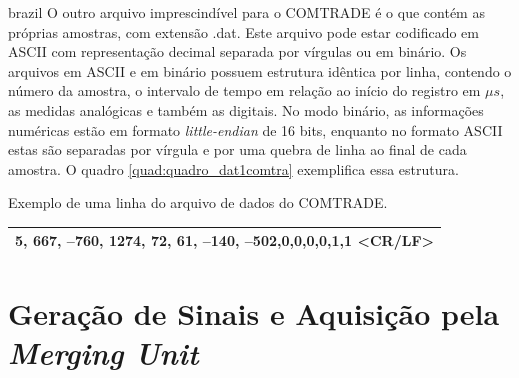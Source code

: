 \begin{otherlanguage*}{brazil}
O outro arquivo imprescindível para o COMTRADE é o que contém as próprias amostras, com extensão .dat. Este arquivo pode estar codificado em ASCII com representação decimal separada por vírgulas ou em binário. Os arquivos em ASCII e em binário possuem estrutura idêntica por linha, contendo o número da amostra, o intervalo de tempo em relação ao início do registro em $\mu s$, as medidas analógicas e também as digitais. No modo binário, as informações numéricas estão em formato \textit{little-endian} de 16 bits, enquanto no formato ASCII estas são separadas por vírgula e por uma quebra de linha ao final de cada amostra. O quadro \ref{quad:quadro_dat1comtra} exemplifica essa estrutura.


\begin{quadro}[htb]
\caption[Exemplo de uma linha do arquivo de dados do COMTRADE]{Exemplo de uma linha do arquivo de dados do COMTRADE.}
\label{quad:quadro_dat1comtra}
\centering
\begin{tabular}{|c|}
5, 667, –760, 1274, 72, 61, –140, –502,0,0,0,0,1,1 <CR/LF>\\
\hline
\end{tabular}
\end{quadro}


\section{Geração de Sinais e Aquisição pela \textit{Merging Unit}}



\end{otherlanguage*}

